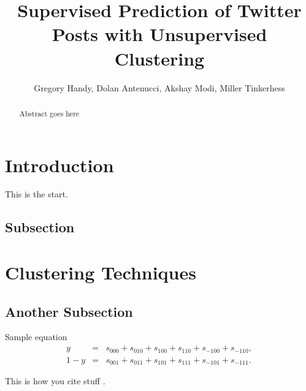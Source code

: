 \documentclass[12pt]{amsart}
\begin{document}
\title{Supervised Prediction of Twitter Posts with Unsupervised Clustering}
\author{Gregory Handy, Dolan Antenucci, Akshay Modi, Miller Tinkerhess} 

\begin{abstract}
Abstract goes here
\end{abstract}


\maketitle



\section{Introduction}
This is the start.

\subsection{Subsection}


\section{Clustering Techniques}


\subsection{Another Subsection}
Sample equation
\begin{eqnarray}
    y &=& s_{000} + s_{010} + s_{100} + s_{110} + s_{-100} +s_{-110},   \nonumber\\
    1-y &=& s_{001} + s_{011} + s_{101} + s_{111} + s_{-101} +s_{-111}. \label{eqn:1-y}
\end{eqnarray}

 This is how you cite stuff \cite{Shiels2011}.   


\end{document}
